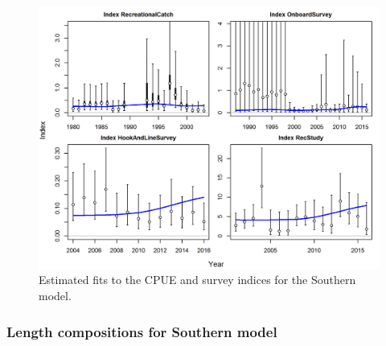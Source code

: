 \documentclass[12pt,]{article}
\begin{document}
\begin{figure}[htbp]
\centering
\includegraphics{r4ss/plots_mod2/index0_all_indices_fit.png}
\caption{Estimated fits to the CPUE and survey indices for the Southern
model. \label{fig:index_fits2}}
\end{figure}

\FloatBarrier 

\newpage

\subsubsection{Length compositions for Southern
model}\label{length-compositions-for-southern-model}
\end{document}
